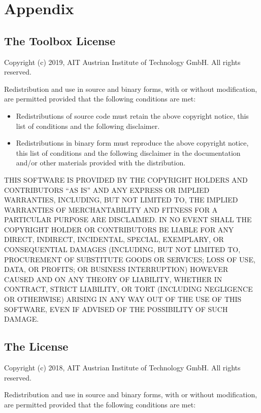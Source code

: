 \chapter{Appendix}

\section{The \fmipp \matlab Toolbox License}
\label{matlab_fmu_license}

Copyright (c) 2019, AIT Austrian Institute of Technology GmbH. All
rights reserved.

Redistribution and use in source and binary forms, with or without
modification, are permitted provided that the following conditions are
met:

\begin{itemize}
\itemsep1pt\parskip0pt
\item
  Redistributions of source code must retain the above copyright notice,
  this list of conditions and the following disclaimer.
\item
  Redistributions in binary form must reproduce the above copyright
  notice, this list of conditions and the following disclaimer in the
  documentation and/or other materials provided with the distribution.
\end{itemize}

THIS SOFTWARE IS PROVIDED BY THE COPYRIGHT HOLDERS AND CONTRIBUTORS ``AS
IS'' AND ANY EXPRESS OR IMPLIED WARRANTIES, INCLUDING, BUT NOT LIMITED
TO, THE IMPLIED WARRANTIES OF MERCHANTABILITY AND FITNESS FOR A
PARTICULAR PURPOSE ARE DISCLAIMED. IN NO EVENT SHALL THE COPYRIGHT
HOLDER OR CONTRIBUTORS BE LIABLE FOR ANY DIRECT, INDIRECT, INCIDENTAL,
SPECIAL, EXEMPLARY, OR CONSEQUENTIAL DAMAGES (INCLUDING, BUT NOT LIMITED
TO, PROCUREMENT OF SUBSTITUTE GOODS OR SERVICES; LOSS OF USE, DATA, OR
PROFITS; OR BUSINESS INTERRUPTION) HOWEVER CAUSED AND ON ANY THEORY OF
LIABILITY, WHETHER IN CONTRACT, STRICT LIABILITY, OR TORT (INCLUDING
NEGLIGENCE OR OTHERWISE) ARISING IN ANY WAY OUT OF THE USE OF THIS
SOFTWARE, EVEN IF ADVISED OF THE POSSIBILITY OF SUCH DAMAGE.


\section{The \fmipp License}
\label{fmipp_license}

Copyright (c) 2018, AIT Austrian Institute of Technology GmbH. All
rights reserved.

Redistribution and use in source and binary forms, with or without
modification, are permitted provided that the following conditions are
met:

